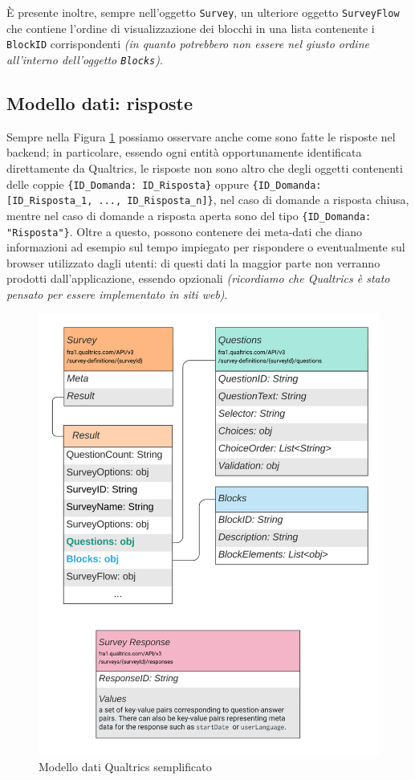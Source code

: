 È presente inoltre, sempre nell'oggetto \texttt{Survey}, un ulteriore oggetto \texttt{SurveyFlow} che contiene l'ordine di visualizzazione dei blocchi in una lista contenente i \texttt{BlockID} corrispondenti \textit{(in quanto potrebbero non essere nel giusto ordine all'interno dell'oggetto \texttt{Blocks})}.

\subsection{Modello dati: risposte}
\label{subsection:risposte}
Sempre nella Figura \ref{fig:modello_semplice_qualtrics} possiamo osservare anche come sono fatte le risposte nel backend; in particolare, essendo ogni entità opportunamente identificata direttamente da Qualtrics, le risposte non sono altro che degli oggetti contenenti delle coppie \texttt{\{ID\_Domanda: ID\_Risposta\}} oppure \texttt{\{ID\_Domanda: [ID\_Risposta\_1, ..., ID\_Risposta\_n]\}}, nel caso di domande a risposta chiusa, mentre nel caso di domande a risposta aperta sono del tipo \texttt{\{ID\_Domanda: "Risposta"\}}. Oltre a questo, possono contenere dei meta-dati che diano informazioni ad esempio sul tempo impiegato per rispondere o eventualmente sul browser utilizzato dagli utenti: di questi dati la maggior parte non verranno prodotti dall'applicazione, essendo opzionali \textit{(ricordiamo che Qualtrics è stato pensato per essere implementato in siti web)}.

\begin{figure}
\centering
\includegraphics[width=\textwidth]{img/modello_semplice_qualtrics}
\caption{Modello dati Qualtrics semplificato}
\label{fig:modello_semplice_qualtrics}
\end{figure}

